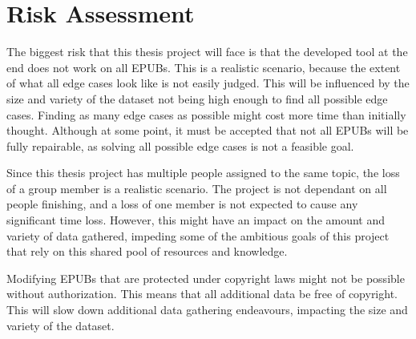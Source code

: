 \section{Risk Assessment}
\label{sec:risk_assessment}
The biggest risk that this thesis project will face is that the developed tool at the end does not work on all EPUBs. This is a realistic scenario, because the extent of what all edge cases look like is not easily judged. This will be influenced by the size and variety of the dataset not being high enough to find all possible edge cases. Finding as many edge cases as possible might cost more time than initially thought. Although at some point, it must be accepted that not all EPUBs will be fully repairable, as solving all possible edge cases is not a feasible goal.

Since this thesis project has multiple people assigned to the same topic, the loss of a group member is a realistic scenario. The project is not dependant on all people finishing, and a loss of one member is not expected to cause any significant time loss. However, this might have an impact on the amount and variety of data gathered, impeding some of the ambitious goals of this project that rely on this shared pool of resources and knowledge.

Modifying EPUBs that are protected under copyright laws might not be possible without authorization. This means that all additional data be free of copyright. This will slow down additional data gathering endeavours, impacting the size and variety of the dataset.